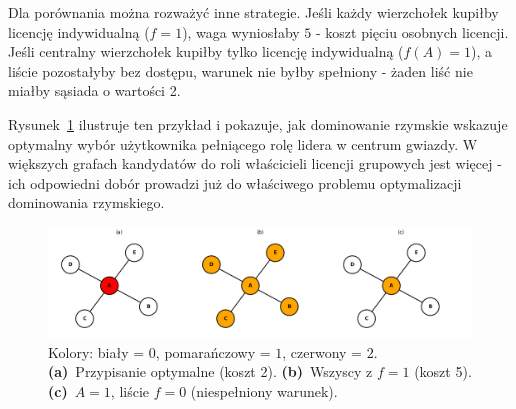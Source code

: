 Dla porównania można rozważyć inne strategie. Jeśli każdy wierzchołek kupiłby licencję indywidualną ($f=1$), waga wyniosłaby $5$ - koszt pięciu osobnych licencji. Jeśli centralny wierzchołek kupiłby tylko licencję indywidualną ($f(A)=1$), a liście pozostałyby bez dostępu, warunek nie byłby spełniony - żaden liść nie miałby sąsiada o wartości 2.

Rysunek~\ref{fig:romandomatinonstarexamepl} ilustruje ten przykład i pokazuje, jak dominowanie rzymskie wskazuje optymalny wybór użytkownika pełniącego rolę lidera w centrum gwiazdy. W większych grafach kandydatów do roli właścicieli licencji grupowych jest więcej - ich odpowiedni dobór prowadzi już do właściwego problemu optymalizacji dominowania rzymskiego.


\begin{figure}[H]
  \centering
  \includegraphics[width=1\textwidth]{assets/stars.png}
  \caption{
    Kolory: biały = $0$, pomarańczowy = $1$, czerwony = $2$.
    \textbf{(a)}~Przypisanie optymalne (koszt 2).
    \textbf{(b)}~Wszyscy z $f=1$ (koszt 5).
    \textbf{(c)}~$A=1$, liście $f=0$ (niespełniony warunek).
  }
  \label{fig:romandomatinonstarexamepl}
\end{figure}




